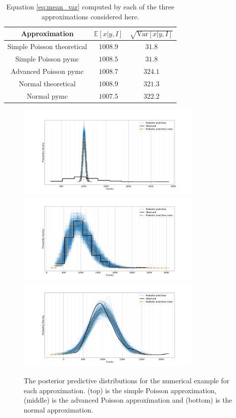 \begin{example}
	\begin{table}[h]
		\centering
		\begin{tabular}{|c|c|c|}
			\hline
			\multicolumn{1}{|c|}{Approximation} & \multicolumn{1}{c|}{$\mathbb{E}[x|y,I]$} & \multicolumn{1}{c|}{$\sqrt{\text{Var}[x|y,I]}$} \\
			\hline\hline
			Simple Poisson theoretical & $1008.9$ & $31.8$ \\
			Simple Poisson pymc & $1008.5$ & $31.8$ \\
			\hline
			Advanced Poisson pymc & $1008.7$ & $324.1$ \\
			\hline
			Normal theoretical & $1008.9$ & $321.3$\\
			Normal pymc & $1007.5$ & $322.2$\\
			\hline
		\end{tabular}
		\caption{Equation \eqref{eq:mean_var} computed by each of the three approximations considered here.}
		\label{tab:1}
	\end{table}
	
	\begin{figure}[H]
		\centering
		\includegraphics[width = 0.8\textwidth]{figures/pymc_poisson.pdf}
		\includegraphics[width = 0.8\textwidth]{figures/pymc_negbin.pdf}
		\includegraphics[width = 0.8\textwidth]{figures/pymc_normal.pdf}
		\caption{The posterior predictive distributions for the numerical example for each approximation. (top) is the simple Poisson approximation, (middle) is the advanced Poisson approximation and (bottom) is the normal approximation.}
		\label{fig:q2}
	\end{figure}
	
\end{example}